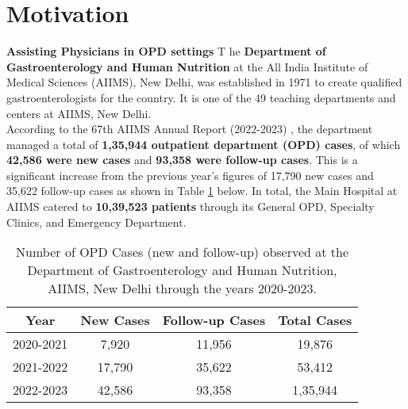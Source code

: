 \section{Motivation}
\textcolor{TUMBlue}{\textbf{Assisting Physicians in OPD settings}}
\lettrine{T}{ }he \textcolor{TUMRed}{\textbf{Department of Gastroenterology and Human Nutrition}} at the All India Institute of Medical Sciences (AIIMS), New Delhi, was established in 1971 to create qualified gastroenterologists for the country. It is one of the 49 teaching departments and centers at AIIMS, New Delhi.\\[\baselineskip]

\noindent According to the 67th AIIMS Annual Report (2022-2023) \cite{AIIMS2024}, the department managed a total of \textcolor{TUMRed}{\textbf{1,35,944 outpatient department (OPD) cases}}, of which \textcolor{TUMRed}{\textbf{42,586 were new cases}} and \textcolor{TUMRed}{\textbf{93,358 were follow-up cases}}. This is a significant increase from the previous year's figures of 17,790 new cases and 35,622 follow-up cases as shown in Table \ref{tab:aiims_opd} below. In total, the Main Hospital at AIIMS catered to \textcolor{TUMRed}{\textbf{10,39,523 patients}} through its General OPD, Specialty Clinics, and Emergency Department.

\begin{table}[h]
    \centering
    \begin{tabular}{|c|c|c|c|}
        \hline
        \textbf{Year} & \textbf{New Cases} & \textbf{Follow-up Cases} & \textbf{Total Cases} \\
        \hline
        2020-2021 & 7,920 & 11,956 & 19,876 \\
        2021-2022 & 17,790 & 35,622 & 53,412 \\
        2022-2023 & 42,586 & 93,358 & 1,35,944 \\
        \hline
    \end{tabular}
    \caption{Number of OPD Cases (new and follow-up) observed at the Department of Gastroenterology and Human Nutrition, AIIMS, New Delhi through the years 2020-2023.}
    \label{tab:aiims_opd}
\end{table}

